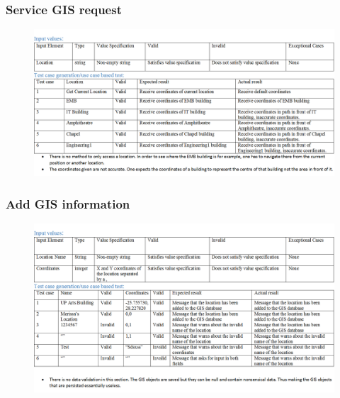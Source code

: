 \documentclass[english]{article}
\begin{document}
\subsubsection{Service GIS request}
\begin{figure}[ht!]
\hspace*{-2.5cm}
\includegraphics[width=180mm]{ServiceGISReq.png}
\end{figure}
\subsubsection{Add GIS information}
\begin{figure}[ht!]
\hspace*{-2.5cm}
\includegraphics[width=180mm]{AddGISInformation.png}
\end{figure}
\end{document}

